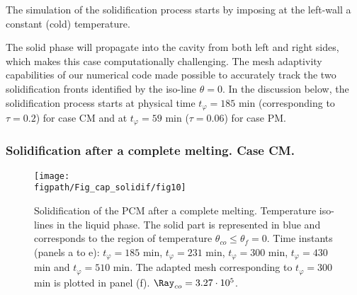 The simulation of the solidification process starts by imposing at the left-wall a constant (cold)  temperature.

 The solid phase will propagate into the cavity from both left and right sides, which makes this case computationally challenging. The mesh adaptivity capabilities of our numerical code made possible to accurately track the 
two solidification fronts identified by the iso-line $\theta=0$.  
In the discussion below,  the solidification process starts at physical time $t_{\varphi} = 185 $ min (corresponding to $\tau=0.2$) for case CM and at $t_{\varphi} = 59$ min ($\tau=0.06$) for case PM. 

\subsubsection{Solidification after a complete melting. Case CM.} \label{sec_solid_full} 

\begin{figure}
	\begin{center}
		\texttt{[image: \\figpath/Fig\_cap\_solidif/fig10]}
	\end{center}
	\caption{Solidification of the PCM after a complete melting. 
	Temperature iso-lines in the liquid phase. 
	The solid part is represented in blue and corresponds to the region of temperature $\theta_{co} \leq \theta_f=0$. 
	Time instants (panels  a to e): $t_{\varphi} = 185$ min, $t_{\varphi} = 231$ min, $t_{\varphi} = 300$ min, $t_{\varphi} = 430$ min and $t_{\varphi} = 510$ min. 
	The adapted mesh corresponding to $t_{\varphi} = 300$ min is plotted in panel (f).  $\Ray_{co}=3.27 \cdot 10^5$. }\label{fig:evolution}
\end{figure}

